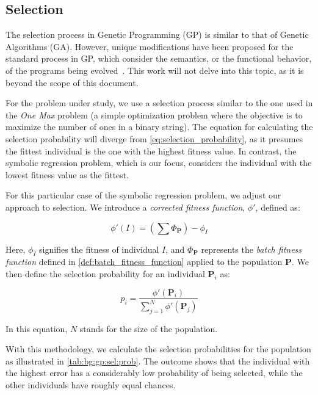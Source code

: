 \subsection{Selection}
\label{sec:background:genetic_programming:selection}

  The selection process in Genetic Programming (GP) is similar to that of Genetic 
  Algorithms (GA).
  However, unique modifications have been proposed for the standard process in GP,
  which consider the semantics, or the functional behavior, of the programs being
  evolved~\autocite{liskowskiComparisonSemanticawareSelection2015}.
  This work will not delve into this topic, as it is beyond the scope of this
  document.

  For the problem under study, we use a selection process similar to the one 
  used in the \textit{One Max} problem (a simple optimization problem where the 
  objective is to maximize the number of ones in a binary string).
  The equation for calculating the selection probability will diverge from 
  \vref{eq:selection_probability}, as it presumes the fittest individual is the 
  one with the highest fitness value.
  In contrast, the symbolic regression problem, which is our focus, considers the
  individual with the lowest fitness value as the fittest.

  For this particular case of the symbolic regression problem, we adjust our 
  approach to selection.
  We introduce a \emph{corrected fitness function}, \(\phi'\), defined as:

  \begin{equation}
    \label{eq:bg:gp:sym:corrected_fitness}
    \phi'(I) = \left(\sum \Phi_\mathbf{P}\right) - \phi_I
  \end{equation}

  Here, \(\phi_I\) signifies the fitness of individual \(I\), and 
  \(\Phi_\mathbf{P}\) represents the \textit{batch fitness function} defined in 
  \vref{def:batch_fitness_function} applied to the population \(\mathbf{P}\).
  We then define the selection probability for an individual \(\mathbf{P}_i\) as:

  \begin{equation}
    \label{eq:bg:gp:sym:selection_probability}
    p_i = \frac{\phi'(\mathbf{P}_i)}{\sum_{j = 1}^N \phi'(\mathbf{P}_j)}
  \end{equation}

  In this equation, \(N\) stands for the size of the population.

  With this methodology, we calculate the selection probabilities for the 
  population as illustrated in \vref{tab:bg:gp:sel:prob}.
  The outcome shows that 
  the individual with the highest error has a considerably low probability of 
  being selected, while the other individuals have roughly equal chances.

